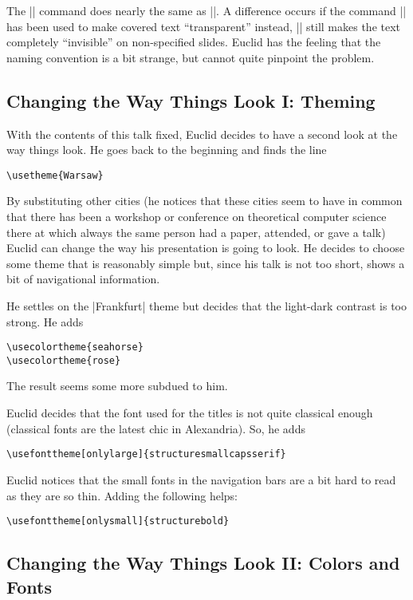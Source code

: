 The |\visible| command does nearly the same as |\uncover|. A
difference occurs if the command || has
been used to make covered text ``transparent'' instead, |\visible| still makes the text
completely ``invisible'' on non-specified slides. Euclid has
the feeling that the naming convention is a bit strange, but cannot
quite pinpoint the problem.

\subsection{Changing the Way Things Look I: Theming}

With the contents of this talk fixed, Euclid decides to have a second
look at the way things look. He goes back to the beginning and finds
the line
\begin{verbatim}
\usetheme{Warsaw}
\end{verbatim}
By substituting other cities (he notices that these cities seem to
have in common that there has been a workshop or conference on
theoretical computer science there at which always the same person had
a paper, attended, or gave a talk) Euclid can change the way his
presentation is going to look. He decides to choose some theme that is
reasonably simple but, since his talk is not too short, shows a bit of
navigational information.

He settles on the |Frankfurt| theme but decides that the light-dark
contrast is too strong. He adds
\begin{verbatim}
\usecolortheme{seahorse}
\usecolortheme{rose} 
\end{verbatim}  
The result seems some more subdued to him.

Euclid decides that the font used for the titles is not quite
classical enough (classical fonts are the latest chic in
Alexandria). So, he adds
\begin{verbatim}
\usefonttheme[onlylarge]{structuresmallcapsserif}
\end{verbatim}

Euclid notices that the small fonts in the navigation bars
are a bit hard to read as they are so thin. Adding the following
helps:
\begin{verbatim}
\usefonttheme[onlysmall]{structurebold}
\end{verbatim}


\subsection{Changing the Way Things Look II: Colors and Fonts}


